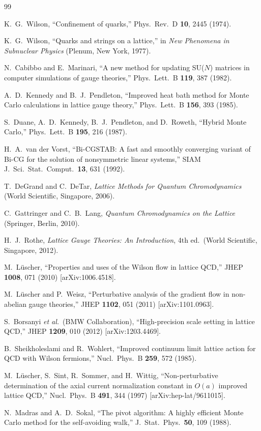 \documentclass[12pt]{article}
\begin{document}
\begin{thebibliography}{99}

K.~G.~Wilson,
``Confinement of quarks,''
Phys.\ Rev.\ D \textbf{10}, 2445 (1974).

K.~G.~Wilson,
``Quarks and strings on a lattice,''
in \textit{New Phenomena in Subnuclear Physics} (Plenum, New York, 1977).

N.~Cabibbo and E.~Marinari,
``A new method for updating SU($N$) matrices in computer simulations of gauge theories,''
Phys.\ Lett.\ B \textbf{119}, 387 (1982).

A.~D.~Kennedy and B.~J.~Pendleton,
``Improved heat bath method for Monte Carlo calculations in lattice gauge theory,''
Phys.\ Lett.\ B \textbf{156}, 393 (1985).

S.~Duane, A.~D.~Kennedy, B.~J.~Pendleton, and D.~Roweth,
``Hybrid Monte Carlo,''
Phys.\ Lett.\ B \textbf{195}, 216 (1987).

H.~A.~van der Vorst,
``Bi-CGSTAB: A fast and smoothly converging variant of Bi-CG for the solution of nonsymmetric linear systems,''
SIAM J.\ Sci.\ Stat.\ Comput.\ \textbf{13}, 631 (1992).

T.~DeGrand and C.~DeTar,
\textit{Lattice Methods for Quantum Chromodynamics}
(World Scientific, Singapore, 2006).

C.~Gattringer and C.~B.~Lang,
\textit{Quantum Chromodynamics on the Lattice}
(Springer, Berlin, 2010).

H.~J.~Rothe,
\textit{Lattice Gauge Theories: An Introduction}, 4th ed.\
(World Scientific, Singapore, 2012).

M.~L\"uscher,
``Properties and uses of the Wilson flow in lattice QCD,''
JHEP \textbf{1008}, 071 (2010)
[arXiv:1006.4518].

M.~L\"uscher and P.~Weisz,
``Perturbative analysis of the gradient flow in non-abelian gauge theories,''
JHEP \textbf{1102}, 051 (2011)
[arXiv:1101.0963].

S.~Borsanyi \textit{et al.}\ (BMW Collaboration),
``High-precision scale setting in lattice QCD,''
JHEP \textbf{1209}, 010 (2012)
[arXiv:1203.4469].

B.~Sheikholeslami and R.~Wohlert,
``Improved continuum limit lattice action for QCD with Wilson fermions,''
Nucl.\ Phys.\ B \textbf{259}, 572 (1985).

M.~L\"uscher, S.~Sint, R.~Sommer, and H.~Wittig,
``Non-perturbative determination of the axial current normalization constant in $O(a)$ improved lattice QCD,''
Nucl.\ Phys.\ B \textbf{491}, 344 (1997)
[arXiv:hep-lat/9611015].

N.~Madras and A.~D.~Sokal,
``The pivot algorithm: A highly efficient Monte Carlo method for the self-avoiding walk,''
J.\ Stat.\ Phys.\ \textbf{50}, 109 (1988).

\end{thebibliography}
\end{document}

